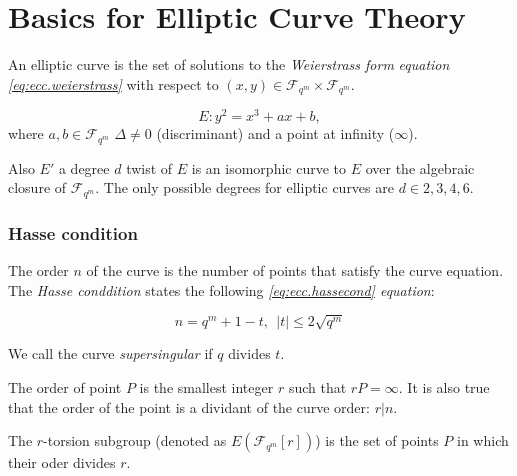 
\section{Basics for Elliptic Curve Theory}
\label{sec:apx.ecc.curves}

An elliptic curve is the set of solutions to the \textit{Weierstrass form}
\textit{equation \ref{eq:ecc.weierstrass}} with respect to
$(x,y) \in \mathcal{F}_{q^m} \times \mathcal{F}_{q^m}$.\cite{ecc.fam.param}

\begin{equation}
\label{eq:ecc.weierstrass}
E: y^2 = x^3 + ax + b,
\end{equation}
where $a,b \in \mathcal{F}_{q^m}$ $\Delta \neq 0 $ (discriminant)
and a point at infinity ($\infty$).\cite{ecc.fam.param}

Also $E'$ a degree $d$ twist of $E$ is an isomorphic curve to $E$
over the algebraic closure of $\mathcal{F}_{q^m}$. The only possible
degrees for elliptic curves are $d \in {2,3,4,6}$.\cite{ecc.fam.param}

\subsubsection{Hasse condition}

The order $n$ of the curve is the number of points that satisfy
the curve equation. The \textit{Hasse conddition} states the following
\textit{\ref{eq:ecc.hassecond} equation}:

\begin{equation}
    \label{eq:ecc.hassecond}
    n = q^m +1 - t,~~ \lvert t \rvert \leq 2 \sqrt{q^m}
\end{equation}

We call the curve \textit{supersingular} if $q$ divides $t$.

The order of point $P$ is the smallest integer $r$ such that
$rP = \infty$. It is also true that the order of the point
is a dividant of the curve order: $r|n$.\cite{ecc.fam.param}

The $r$-torsion subgroup (denoted as $E(\mathcal{F}_{q^m}[r])$) is the
set of points $P$ in which their oder divides $r$.\cite{ecc.fam.param}

